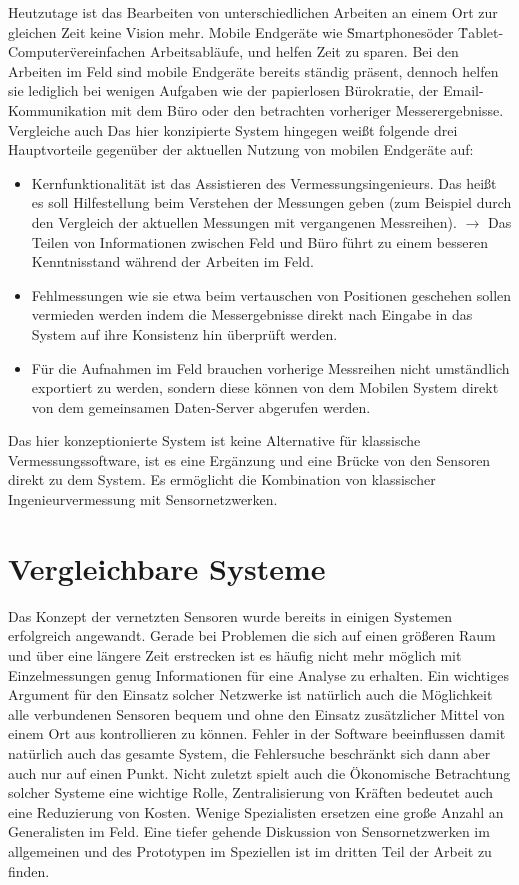 Heutzutage ist das Bearbeiten von unterschiedlichen Arbeiten an einem Ort zur gleichen Zeit keine Vision mehr. Mobile Endgeräte wie \"Smartphones\" oder \"Tablet-Computer\" vereinfachen Arbeitsabläufe, und helfen Zeit zu sparen. Bei den Arbeiten im Feld sind mobile Endgeräte bereits ständig präsent, dennoch helfen sie lediglich bei wenigen Aufgaben wie der papierlosen Bürokratie, der Email-Kommunikation mit dem Büro oder den betrachten vorheriger Messerergebnisse. Vergleiche auch \citep{breunig_entwicklung_2003} \citep{breunig_vision_2003} Das hier konzipierte System hingegen weißt folgende drei Hauptvorteile gegenüber der aktuellen Nutzung von mobilen Endgeräte auf:
\begin{itemize}
\item Kernfunktionalität ist das Assistieren des Vermessungsingenieurs. Das heißt es soll Hilfestellung beim Verstehen der Messungen geben (zum Beispiel durch den Vergleich der aktuellen Messungen mit vergangenen Messreihen). $\rightarrow$ Das Teilen von Informationen zwischen Feld und Büro führt zu einem besseren Kenntnisstand während der Arbeiten im Feld.
\item Fehlmessungen wie sie etwa beim vertauschen von Positionen geschehen sollen vermieden werden indem die Messergebnisse direkt nach Eingabe in das System auf ihre Konsistenz hin überprüft werden.
\item Für die Aufnahmen im Feld brauchen vorherige Messreihen nicht umständlich exportiert zu werden, sondern diese können von dem Mobilen System direkt von dem gemeinsamen Daten-Server abgerufen werden.
\end{itemize}
Das hier konzeptionierte System ist keine Alternative für klassische Vermessungssoftware, ist es eine Ergänzung und eine Brücke von den Sensoren direkt zu dem System. Es ermöglicht die Kombination von klassischer Ingenieurvermessung mit Sensornetzwerken.


\section{Vergleichbare Systeme}
Das Konzept der vernetzten Sensoren wurde bereits in einigen Systemen erfolgreich angewandt. Gerade bei Problemen die sich auf einen größeren Raum und über eine längere Zeit erstrecken ist es häufig nicht mehr möglich mit Einzelmessungen genug Informationen für eine Analyse zu erhalten. Ein wichtiges Argument für den Einsatz solcher Netzwerke ist natürlich auch die Möglichkeit alle verbundenen Sensoren bequem und ohne den Einsatz zusätzlicher Mittel von einem Ort aus kontrollieren zu können. Fehler in der Software beeinflussen damit natürlich auch das gesamte System, die Fehlersuche beschränkt sich dann aber auch nur auf einen Punkt. Nicht zuletzt spielt auch die Ökonomische Betrachtung solcher Systeme eine wichtige Rolle, Zentralisierung von Kräften bedeutet auch eine Reduzierung von Kosten. Wenige Spezialisten ersetzen eine große Anzahl an Generalisten im Feld. Eine tiefer gehende Diskussion von Sensornetzwerken im allgemeinen und des Prototypen im Speziellen ist im dritten Teil der Arbeit zu finden.

